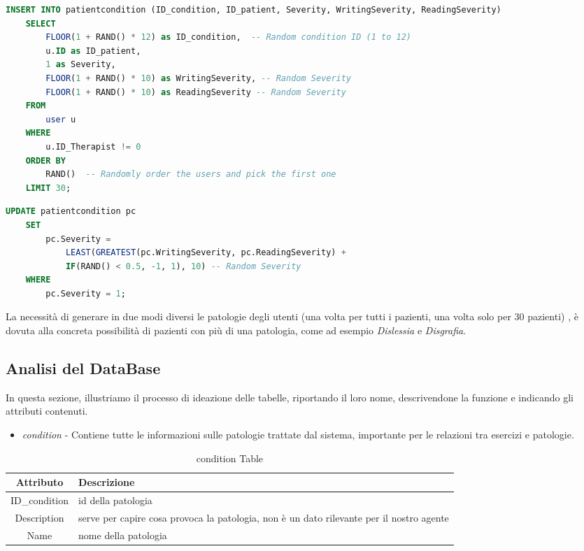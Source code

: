 \documentclass{article}
\begin{document}
    \begin{lstlisting}[language=SQL, caption=Generazione delle Writing e Reading severity (solo per 30 pazienti)]
    INSERT INTO patientcondition (ID_condition, ID_patient, Severity, WritingSeverity, ReadingSeverity)
    SELECT
        FLOOR(1 + RAND() * 12) as ID_condition,  -- Random condition ID (1 to 12)
        u.ID as ID_patient,
        1 as Severity,
        FLOOR(1 + RAND() * 10) as WritingSeverity, -- Random Severity
        FLOOR(1 + RAND() * 10) as ReadingSeverity -- Random Severity
    FROM
        user u
    WHERE
        u.ID_Therapist != 0
    ORDER BY
        RAND()  -- Randomly order the users and pick the first one
    LIMIT 30;
    \end{lstlisting}

    \begin{lstlisting}[language=SQL, caption=Generazione della General severity (tutti i pazienti)]
    UPDATE patientcondition pc
    SET
        pc.Severity =
            LEAST(GREATEST(pc.WritingSeverity, pc.ReadingSeverity) +
            IF(RAND() < 0.5, -1, 1), 10) -- Random Severity
    WHERE
        pc.Severity = 1;
    \end{lstlisting}

    La necessità di generare in due modi diversi le patologie degli utenti (una volta per tutti i pazienti, una volta solo per 30 pazienti) , è dovuta alla concreta possibilità di pazienti con più di una patologia, come ad esempio \textit{Dislessia} e \textit{Disgrafia}.

    \pagebreak

    \subsection{Analisi del DataBase}
    In questa sezione, illustriamo il processo di ideazione delle tabelle, riportando il loro nome, descrivendone la funzione e indicando gli attributi contenuti.

\begin{itemize}
\item     \textit{condition} - Contiene tutte le informazioni sulle patologie trattate dal sistema, importante per le relazioni tra esercizi e patologie.
\end{itemize}

    \begin{table}[h]
        \centering
        \caption{condition Table}
        \begin{tabular}{|c|p{8cm}|}
            \hline
                \textbf{Attributo} & \textbf{Descrizione} \\
            \hline
                ID\_condition & id della patologia\\
            \hline
                Description & serve per capire cosa provoca la patologia, non è un dato rilevante per il nostro agente\\
            \hline
                Name & nome della patologia\\
            \hline
        \end{tabular}
    \end{table}
\end{document}
